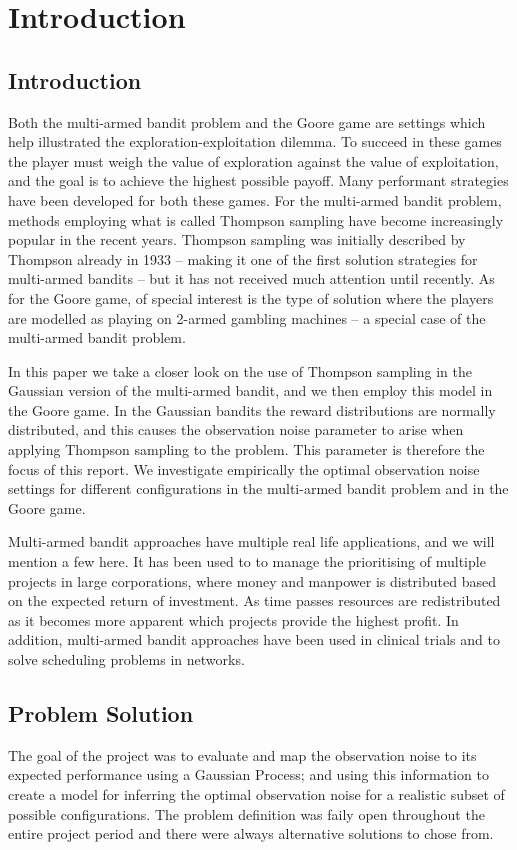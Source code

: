 \chapter{Introduction}
\label{ch:introduction}

\section{Introduction}
Both the multi-armed bandit problem and the Goore game are settings which help illustrated the exploration-exploitation dilemma.
To succeed in these games the player must weigh the value of exploration against the value of exploitation, and the goal is to achieve the highest possible payoff.
Many performant strategies have been developed for both these games.
For the multi-armed bandit problem, methods employing what is called Thompson sampling have become increasingly popular in the recent years.
Thompson sampling was initially described by Thompson already in 1933 -- making it one of the first solution strategies for multi-armed bandits -- but it has not received much attention until recently.
As for the Goore game, of special interest is the type of solution where the players are modelled as playing on 2-armed gambling machines -- a special case of the multi-armed bandit problem.

In this paper we take a closer look on the use of Thompson sampling in the Gaussian version of the multi-armed bandit, and we then employ this model in the Goore game.
In the Gaussian bandits the reward distributions are normally distributed, and this causes the observation noise parameter \ob{} to arise when applying Thompson sampling to the problem.
This parameter is therefore the focus of this report.
We investigate empirically the optimal observation noise settings for different configurations in the multi-armed bandit problem and in the Goore game.



Multi-armed bandit approaches have multiple real life applications, and we will mention a few here.
It has been used to to manage the prioritising of multiple projects in large corporations, where money and manpower is distributed based on the expected return of investment.
As time passes resources are redistributed as it becomes more apparent which projects provide the highest profit.
In addition, multi-armed bandit approaches have been used in clinical trials and to solve scheduling problems in networks.

\section{Problem Solution}
The goal of the project was to evaluate and map the observation noise to its expected performance using
a Gaussian Process; and using this information to create a model for inferring the optimal observation noise 
for a realistic subset of possible configurations. The problem definition was faily open throughout the entire
project period and there were always alternative solutions to chose from. 

